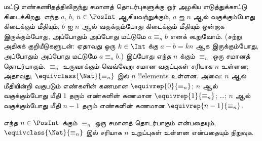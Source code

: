 \documentclass[../../../include/open-logic-section]{subfiles}
\begin{document}
\begin{ex}
மட்டு எண்கணிதத்திலிருந்து சமானத் தொடர்புகளுக்கு ஓர் அழகிய எடுத்துக்காட்டு கிடைக்கிறது.
எந்த $a$, $b$, $n \in \PosInt$ ஆகியவற்றுக்கும்,
$a$ ஐ $n$ ஆல் வகுக்கும்போது கிடைக்கும் மீதியும்,
$b$ ஐ $n$ ஆல் வகுக்கும்போது கிடைக்கும் மீதியும் ஒன்றாக இருக்கும்போது,
அப்போதும் அப்போது மட்டுமே $a \equiv_n b$ எனக் கூறுவோம்.
(சற்று அதிகக் குறியீடுகளுடன்: ஏதாவது ஒரு $k \in \Int$ க்கு
$a - b = kn$ ஆக இருக்கும்போது, அப்போதும் அப்போது மட்டுமே $a \equiv_n b$.)
இப்போது எந்த $n$ க்கும் $\equiv_n$ ஒரு சமானத் தொடர்பாகும்.
$\equiv_n$ உருவாக்கும் வெவ்வேறு சமான வகுப்புகள் சரியாக $n$ உள்ளன;
அதாவது, $\equivclass{\Nat}{\equiv_n}$ இல் $n$ !!{element}s உள்ளன.
அவை: $n$ ஆல் மீதியின்றி வகுபடும் எண்களின் கணமான
$\equivrep{0}{\equiv_n}$; $n$ ஆல் வகுக்கும்போது மீதி $1$ தரும் எண்களின்
கணமான $\equivrep{1}{\equiv_n}$; \ldots;
$n$ ஆல் வகுக்கும்போது மீதி $n-1$ தரும் எண்களின் கணமான
$\equivrep{n-1}{\equiv_n}$.
\end{ex}

\begin{prob}
எந்த $n \in \PosInt$ க்கும் $\equiv_n$ ஒரு சமானத் தொடர்பாகும் என்பதையும்,
$\equivclass{\Nat}{\equiv_n}$ இல் சரியாக $n$ உறுப்புகள் உள்ளன என்பதையும் நிறுவுக.
\end{prob}
\end{document}
